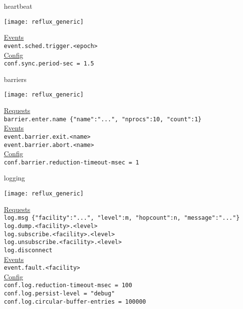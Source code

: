 \documentclass[default,pdf,colorBG,slideColor]{prosper}
\begin{document}
\begin{slide}{heartbeat}{\tiny
\begin{center}
  \texttt{[image: reflux\_generic]}
\end{center}
\underline{Events}\\
{\tt event.sched.trigger.<epoch>}\\
\underline{Config}\\
{\tt conf.sync.period-sec = 1.5}\\
}\end{slide}

\begin{slide}{barriers}{\tiny
\begin{center}
  \texttt{[image: reflux\_generic]}
\end{center}
\underline{Requests}\\
{\tt barrier.enter.name \{"name":"...", "nprocs":10, "count":1\}}\\
\underline{Events}\\
{\tt event.barrier.exit.<name>}\\
{\tt event.barrier.abort.<name>}\\
\underline{Config}\\
{\tt conf.barrier.reduction-timeout-msec = 1}\\
}\end{slide}

\begin{slide}{logging}{\tiny
\begin{center}
  \texttt{[image: reflux\_generic]}
\end{center}
\underline{Requests}\\
{\tt log.msg \{"facility":"...", "level":m, "hopcount":n, "message":"..."\}}\\
{\tt log.dump.<facility>.<level>}\\
{\tt log.subscribe.<facility>.<level>}\\
{\tt log.unsubscribe.<facility>.<level>}\\
{\tt log.disconnect}\\
\underline{Events}\\
{\tt event.fault.<facility>}\\
\underline{Config}\\
{\tt conf.log.reduction-timeout-msec = 100}\\
{\tt conf.log.persist-level = "debug"}\\
{\tt conf.log.circular-buffer-entries = 100000}\\
}\end{slide}
\end{document}
